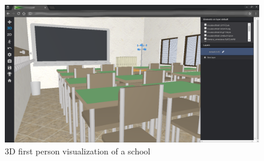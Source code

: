 \begin{figure}[htb]
\centering
\includegraphics[width=\linewidth]{contents/images/3d-school}
\caption{3D first person visualization of a school}
\label{fig3D-school}
\end{figure}
